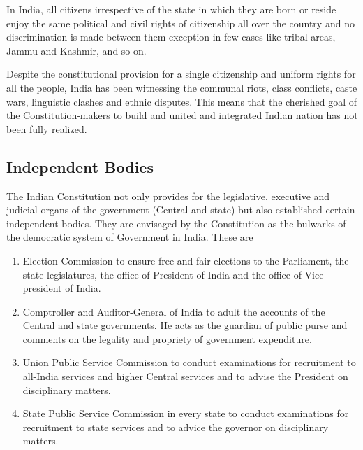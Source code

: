 \begin{multicol}{2}
In India, all citizens irrespective of the state in which they are born or reside enjoy the same political and civil rights of citizenship all over the country and no discrimination is made between them exception in few cases like tribal areas, Jammu and Kashmir, and so on.

Despite the constitutional provision for a single citizenship and uniform rights for all the people, India has been witnessing the communal riots, class conflicts, caste wars, linguistic clashes and ethnic disputes. This means that the cherished goal of the Constitution-makers to build and united and integrated Indian nation has not been fully realized.

\subsection{Independent Bodies}

The Indian Constitution not only provides for the legislative, executive and judicial organs of the government (Central and state) but also established certain independent bodies. They are envisaged by the Constitution as the bulwarks of the democratic system of Government in India. These are

\renewcommand{\labelenumi}{\textbf{(\alph{enumi})}}
\begin{enumerate}
  \item Election Commission to ensure free and fair elections to the Parliament, the state legislatures, the office of President of India and the office of Vice-president of India.
  \item Comptroller and Auditor-General of India to adult the accounts of the Central and state governments. He acts as the guardian of public purse and comments on the legality and propriety of government expenditure.
  \item Union Public Service Commission to conduct examinations for recruitment to all-India services and higher Central services and to advise the President on disciplinary matters.
  \item State Public Service Commission in every state to conduct examinations for recruitment to state services and to advice the governor on disciplinary matters.
\end{enumerate}


\end{multicol}
